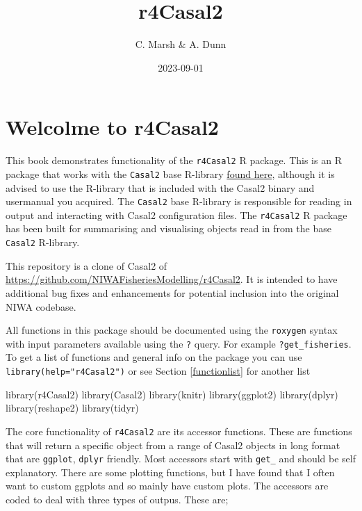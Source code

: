 \documentclass[
]{book}
\title{r4Casal2}
\author{C. Marsh \& A. Dunn}
\date{2023-09-01}
\newenvironment{Shaded}{\begin{snugshade}}{\end{snugshade}}
\newcommand{\FunctionTok}[1]{\textcolor[rgb]{0.00,0.00,0.00}{#1}}
\newcommand{\NormalTok}[1]{#1}
\begin{document}
\maketitle

{
\setcounter{tocdepth}{1}
\tableofcontents
}
\hypertarget{welcolme-to-r4casal2}{%
\chapter{\texorpdfstring{Welcolme to \textbf{r4Casal2}}{Welcolme to r4Casal2}}\label{welcolme-to-r4casal2}}

This book demonstrates functionality of the \texttt{r4Casal2} R package. This is an R package that works with the \texttt{Casal2} base R-library \href{https://github.com/alistairdunn1/CASAL2/tree/master/R-libraries}{found here}, although it is advised to use the R-library that is included with the Casal2 binary and usermanual you acquired. The \texttt{Casal2} base R-library is responsible for reading in output and interacting with Casal2 configuration files. The \texttt{r4Casal2} R package has been built for summarising and visualising objects read in from the base \texttt{Casal2} R-library.

This repository is a clone of Casal2 of \url{https://github.com/NIWAFisheriesModelling/r4Casal2}. It is intended to have additional bug fixes and enhancements for potential inclusion into the original NIWA codebase.

All functions in this package should be documented using the \texttt{roxygen} syntax with input parameters available using the \texttt{?} query. For example \texttt{?get\_fisheries}. To get a list of functions and general info on the package you can use \texttt{library(help="r4Casal2")} or see Section \ref{functionlist} for another list

\begin{Shaded}
\begin{Highlighting}[]
\FunctionTok{library}\NormalTok{(r4Casal2)}
\FunctionTok{library}\NormalTok{(Casal2)}
\FunctionTok{library}\NormalTok{(knitr)}
\FunctionTok{library}\NormalTok{(ggplot2)}
\FunctionTok{library}\NormalTok{(dplyr)}
\FunctionTok{library}\NormalTok{(reshape2)}
\FunctionTok{library}\NormalTok{(tidyr)}
\end{Highlighting}
\end{Shaded}

The core functionality of \texttt{r4Casal2} are its accessor functions. These are functions that will return a specific object from a range of Casal2 objects in long format that are \texttt{ggplot}, \texttt{dplyr} friendly. Most accessors start with \texttt{get\_} and should be self explanatory. There are some plotting functions, but I have found that I often want to custom ggplots and so mainly have custom plots. The accessors are coded to deal with three types of outpus. These are;
\end{document}
